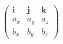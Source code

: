 \documentclass[preview]{standalone}
\begin{document}
\begin{align*}
\begin{pmatrix}
        \mathbf{i} & \mathbf{j} & \mathbf{k} \\
        a_x & a_y & a_z \\
        b_x & b_y & b_z
        \end{pmatrix}
\end{align*}
\end{document}
